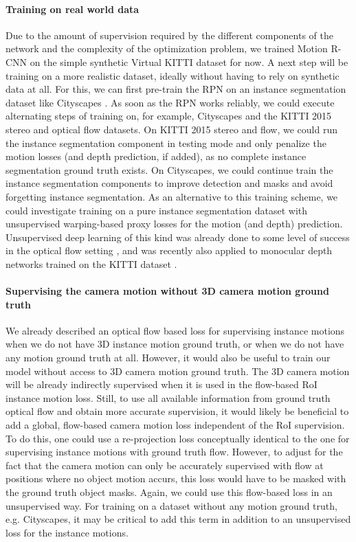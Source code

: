 \paragraph{Training on real world data}
Due to the amount of supervision required by the different components of the network
and the complexity of the optimization problem,
we trained Motion R-CNN on the simple synthetic Virtual KITTI dataset for now.
A next step will be training on a more realistic dataset,
ideally without having to rely on synthetic data at all.
For this, we can first pre-train the RPN on an instance segmentation dataset like
Cityscapes \cite{Cityscapes}. As soon as the RPN works reliably, we could execute alternating
steps of training on, for example, Cityscapes and the KITTI 2015 stereo and optical flow datasets.
On KITTI 2015 stereo and flow, we could run the instance segmentation component in testing mode and only penalize
the motion losses (and depth prediction, if added), as no complete instance segmentation ground truth exists.
On Cityscapes, we could continue train the instance segmentation components to
improve detection and masks and avoid forgetting instance segmentation.
As an alternative to this training scheme, we could investigate training on a pure
instance segmentation dataset with unsupervised warping-based proxy losses for the motion (and depth)
prediction. Unsupervised deep learning of this kind was already done to some level of success in the optical flow
setting \cite{UnsupFlownet, UnFlow},
and was recently also applied to monocular depth networks trained on the KITTI dataset \cite{UnsupDepth}.

\paragraph{Supervising the camera motion without 3D camera motion ground truth}
We already described an optical flow based loss for supervising instance motions
when we do not have 3D instance motion ground truth, or when we do not have
any motion ground truth at all.
However, it would also be useful to train our model without access to 3D camera
motion ground truth.
The 3D camera motion will be already indirectly supervised when it is used in the flow-based
RoI instance motion loss. Still, to use all available information from
ground truth optical flow and obtain more accurate supervision,
it would likely be beneficial to add a global, flow-based camera motion loss
independent of the RoI supervision.
To do this, one could use a re-projection loss conceptually identical to the one
for supervising instance motions with ground truth flow. However, to adjust for the
fact that the camera motion can only be accurately supervised with flow at positions where
no object motion accurs, this loss would have to be masked with the ground truth
object masks. Again, we could use this flow-based loss in an unsupervised way.
For training on a dataset without any motion ground truth, e.g.
Cityscapes, it may be critical to add this term in addition to an unsupervised
loss for the instance motions.

